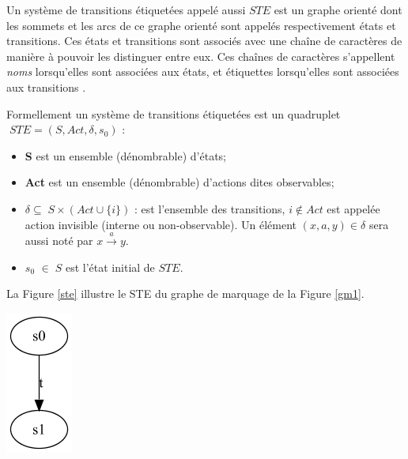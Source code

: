 \begin{definition}
Un système de transitions étiquetées appelé aussi $STE$ est un graphe orienté dont les sommets et les arcs de ce graphe orienté sont appelés respectivement états et transitions. Ces états et transitions sont associés avec une chaîne de caractères de manière à pouvoir les  distinguer entre eux.  Ces chaînes de caractères s'appellent \emph{noms} lorsqu'elles sont associées aux états, et étiquettes lorsqu'elles sont associées aux transitions .


Formellement un système de transitions étiquetées  est un quadruplet $\; STE = (S, Act, \delta, s_0)$ \citep{Saidouni2012}:
\begin{itemize}
	\item\textbf{S} est un ensemble (dénombrable) d'états;
	\item \textbf{Act}  est un ensemble (dénombrable) d'actions dites observables; 
 	\item  $\delta\subseteq \; S \times (Act \cup \{i\})$ : est l'ensemble des transitions, $i \notin Act$ est appelée action invisible (interne ou non-observable). Un élément $(x, a, y) \in \delta $ sera aussi noté par $x \stackrel{a}{\rightarrow}y$.
 	\item $s_0$ $\in\; S$ est l'état initial de $STE$. 
\end{itemize}

La Figure \ref{ste} illustre le STE du graphe de marquage de la Figure \ref{gm1}.
\begin{center}
	\includegraphics[scale=0.4]{img/ste.png}
	 \label{ste}
 \end{center}
\end{definition}

